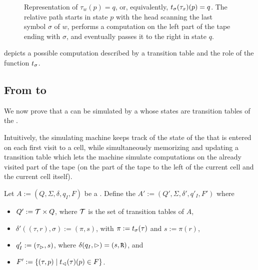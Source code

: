 \begin{figure}
	\centering
	
	\caption[A transition table and the function $\trapp$.]{Representation of $\tau_w(p)=q$, or, equivalently, $t_\sigma(\tau_x)(p)=q$.
		The relative path starts in state $p$ with the head scanning the last symbol $\sigma$ of $w$, performs a computation on the left part of the tape ending with $\sigma$, and eventually passes it to the right in state $q$.}
	\label{fig:transtab}
\end{figure}

 depicts a possible computation described by a transition table and the role of the function $t_\sigma$.


\subsection{From \texorpdfstring{\TDFAs}{2DFAs} to \texorpdfstring{\ODFAs}{1DFAs}}
We now prove that a \TDFA can be simulated by a \ODFA whose states are transition tables of the \TDFA.

Intuitively, the simulating machine keeps track of the state of the \TDFA that is entered on each first visit to a cell, while simultaneously memorizing and updating a transition table which lets the machine simulate computations on the already visited part of the tape (\ie on the part of the tape to the left of the current cell and the current cell itself).

Let $A:=(Q,\Sigma,\delta,q_I,F)$ be a \TDFA.
Define the \ODFA $A':=(Q',\Sigma,\delta',q'_I,F')$ where
\begin{itemize}
	\item $Q':=\mathcal T\times Q$, where $\mathcal T$ is the set of transition tables of $A$,
	\item $\delta'((\tau,r),\sigma):=(\pi,s)$, with $\pi:=t_\sigma(\tau)$ and $s:=\pi(r)$,
	\item $q'_I:=(\tau_\rhd,s)$, where $\delta(q_I,\rhd)=(s,\mathtt R)$, and
	\item $F':=\{(\tau,p)\mid t_\lhd(\tau)(p)\in F\}$.
\end{itemize}

